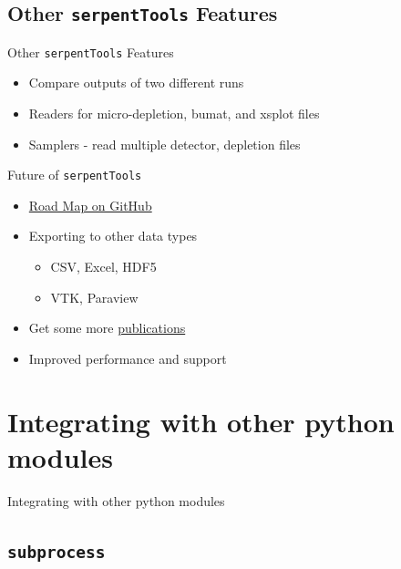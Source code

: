 \documentclass{beamer}
\newcommand{\st}{\texttt{serpentTools} }
\begin{document}
\subsection{Other \st Features}

\begin{frame}{Other \st Features}
    \begin{itemize}
        \item{Compare outputs of two different runs}
        \item{Readers for micro-depletion, bumat, and xsplot files}
        \item{Samplers - read multiple detector, depletion files}
    \end{itemize}
\end{frame}

\begin{frame}{Future of \st}
    \begin{itemize}
        \item{\href{https://github.com/CORE-GATECH-GROUP/serpent-tools/wiki/Road-Map}{Road Map on GitHub}}
        \item{Exporting to other data types}
        \begin{itemize}
            \item{CSV, Excel, HDF5}
            \item{VTK, Paraview}
        \end{itemize}
        \item{Get some more \href{https://github.com/CORE-GATECH-GROUP/serpent-tools/wiki/Publications-using-serpentTools}{publications}}
        \item{Improved performance and support}
    \end{itemize}
\end{frame}

\section{Integrating with other python modules}

\begin{frame}{Integrating with other python modules}
        \tableofcontents[sectionstyle=show/hide,subsectionstyle=show/show/hide]
\end{frame}

\subsection{\texttt{subprocess}}
\end{document}
